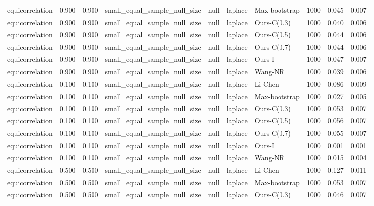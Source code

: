 \begin{tabular}{lrrllllrrr}
equicorrelation & 0.900 & 0.900 & small\_equal\_sample\_null\_size & null & laplace & Max-bootstrap & 1000 & 0.045 & 0.007 \\
equicorrelation & 0.900 & 0.900 & small\_equal\_sample\_null\_size & null & laplace & Ours-C(0.3) & 1000 & 0.040 & 0.006 \\
equicorrelation & 0.900 & 0.900 & small\_equal\_sample\_null\_size & null & laplace & Ours-C(0.5) & 1000 & 0.044 & 0.006 \\
equicorrelation & 0.900 & 0.900 & small\_equal\_sample\_null\_size & null & laplace & Ours-C(0.7) & 1000 & 0.044 & 0.006 \\
equicorrelation & 0.900 & 0.900 & small\_equal\_sample\_null\_size & null & laplace & Ours-I & 1000 & 0.047 & 0.007 \\
equicorrelation & 0.900 & 0.900 & small\_equal\_sample\_null\_size & null & laplace & Wang-NR & 1000 & 0.039 & 0.006 \\
equicorrelation & 0.100 & 0.100 & small\_equal\_sample\_null\_size & null & laplace & Li-Chen & 1000 & 0.086 & 0.009 \\
equicorrelation & 0.100 & 0.100 & small\_equal\_sample\_null\_size & null & laplace & Max-bootstrap & 1000 & 0.027 & 0.005 \\
equicorrelation & 0.100 & 0.100 & small\_equal\_sample\_null\_size & null & laplace & Ours-C(0.3) & 1000 & 0.053 & 0.007 \\
equicorrelation & 0.100 & 0.100 & small\_equal\_sample\_null\_size & null & laplace & Ours-C(0.5) & 1000 & 0.056 & 0.007 \\
equicorrelation & 0.100 & 0.100 & small\_equal\_sample\_null\_size & null & laplace & Ours-C(0.7) & 1000 & 0.055 & 0.007 \\
equicorrelation & 0.100 & 0.100 & small\_equal\_sample\_null\_size & null & laplace & Ours-I & 1000 & 0.001 & 0.001 \\
equicorrelation & 0.100 & 0.100 & small\_equal\_sample\_null\_size & null & laplace & Wang-NR & 1000 & 0.015 & 0.004 \\
equicorrelation & 0.500 & 0.500 & small\_equal\_sample\_null\_size & null & laplace & Li-Chen & 1000 & 0.127 & 0.011 \\
equicorrelation & 0.500 & 0.500 & small\_equal\_sample\_null\_size & null & laplace & Max-bootstrap & 1000 & 0.053 & 0.007 \\
equicorrelation & 0.500 & 0.500 & small\_equal\_sample\_null\_size & null & laplace & Ours-C(0.3) & 1000 & 0.046 & 0.007 \\

\end{tabular}
